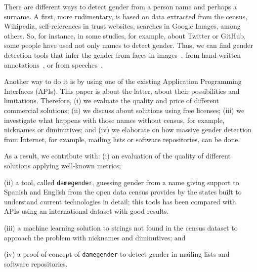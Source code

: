 \documentclass[a4paper]{article}
\begin{document}
There are different ways to detect gender from a person name and perhaps a surname.
A first, more rudimentary, is based on data extracted from the census, Wikipedia, self-references in trust websites, searches in Google Images, among others.
So, for instance, in some studies, for example, about Twitter or GitHub, some people have used not only names to detect gender. 
Thus, we can find gender detection tools that infer the gender from faces in images~\cite{ranjan2017hyperface}, from hand-written annotations~\cite{liwicki2011automatic}, or from speeches~\cite{koppel2002automatically}.

Another way to do it is by using one of the existing Application Programming Interfaces (APIs).
This paper is about the latter, about their possibilities and limitations.
Therefore, (i) we evaluate the quality and price of different commercial solutions;
(ii) we discuss about solutions using free licenses;
(iii) we investigate what happens with those names without census, for example, nicknames or diminutives; and
(iv) we elaborate on how massive gender detection from Internet, for example, mailing
  lists or software repositories, can be done.

As a result, we contribute with: 
(i) an evaluation of the quality of different solutions applying well-known metrics;

(ii) a tool, called \texttt{damegender}, guessing gender from a name
  giving support to Spanish and English from the open data census
  provides by the states built to understand current technologies in
  detail; this tools has been compared with APIs using an international
  dataset with good results.
  
(iii) a machine learning solution to strings not found in the census
  dataset to approach the problem with nicknames and diminutives; and
  
(iv) a proof-of-concept of \texttt{damegender} to detect
  gender in mailing lists and software repositories.

%
\end{document}
